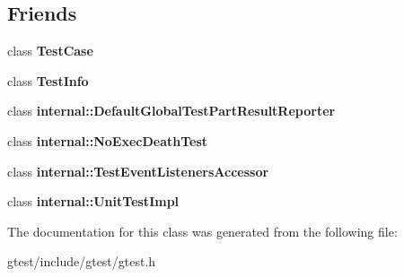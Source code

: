 \subsection*{Friends}
\begin{DoxyCompactItemize}
\item 
\mbox{\label{classtesting_1_1TestEventListeners_aff779e55b06adfa7c0088bd10253f0f0}} 
class {\bfseries Test\+Case}
\item 
\mbox{\label{classtesting_1_1TestEventListeners_a4c49c2cdb6c328e6b709b4542f23de3c}} 
class {\bfseries Test\+Info}
\item 
\mbox{\label{classtesting_1_1TestEventListeners_abae39633da9932847b41cb80efd62115}} 
class {\bfseries internal\+::\+Default\+Global\+Test\+Part\+Result\+Reporter}
\item 
\mbox{\label{classtesting_1_1TestEventListeners_afddba49fdf3f493532b4d5efb9814f4e}} 
class {\bfseries internal\+::\+No\+Exec\+Death\+Test}
\item 
\mbox{\label{classtesting_1_1TestEventListeners_addbc107b6b445617c880182bd4f44cf9}} 
class {\bfseries internal\+::\+Test\+Event\+Listeners\+Accessor}
\item 
\mbox{\label{classtesting_1_1TestEventListeners_acc0a5e7573fd6ae7ad1878613bb86853}} 
class {\bfseries internal\+::\+Unit\+Test\+Impl}
\end{DoxyCompactItemize}


The documentation for this class was generated from the following file\+:\begin{DoxyCompactItemize}
\item 
gtest/include/gtest/gtest.\+h\end{DoxyCompactItemize}
